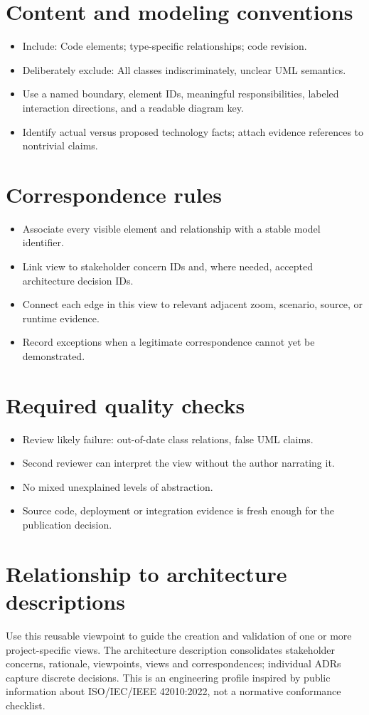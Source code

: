 \documentclass[10pt,letterpaper]{article}
\begin{document}
\section{Content and modeling conventions}
\begin{itemize}
\item Include: Code elements; type-specific relationships; code revision.
\item Deliberately exclude: All classes indiscriminately, unclear UML semantics.
\item Use a named boundary, element IDs, meaningful responsibilities, labeled interaction directions, and a readable diagram key.
\item Identify actual versus proposed technology facts; attach evidence references to nontrivial claims.
\end{itemize}

\section{Correspondence rules}
\begin{itemize}
\item Associate every visible element and relationship with a stable model identifier.
\item Link view to stakeholder concern IDs and, where needed, accepted architecture decision IDs.
\item Connect each edge in this view to relevant adjacent zoom, scenario, source, or runtime evidence.
\item Record exceptions when a legitimate correspondence cannot yet be demonstrated.
\end{itemize}

\section{Required quality checks}
\begin{itemize}
\item Review likely failure: out-of-date class relations, false UML claims.
\item Second reviewer can interpret the view without the author narrating it.
\item No mixed unexplained levels of abstraction.
\item Source code, deployment or integration evidence is fresh enough for the publication decision.
\end{itemize}

\section{Relationship to architecture descriptions}
Use this reusable viewpoint to guide the creation and validation of one or more project-specific views. The architecture description consolidates stakeholder concerns, rationale, viewpoints, views and correspondences; individual ADRs capture discrete decisions. This is an engineering profile inspired by public information about ISO/IEC/IEEE 42010:2022, not a normative conformance checklist.
\end{document}
